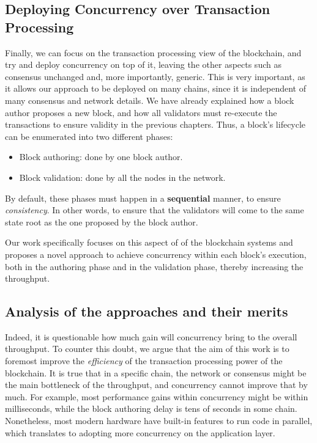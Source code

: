 \subsection{Deploying Concurrency over Transaction Processing}

Finally, we can focus on the transaction processing view of the blockchain, and try and deploy
concurrency on top of it, leaving the other aspects such as consensus unchanged and, more
importantly, generic. This is very important, as it allows our approach to be deployed on many
chains, since it is independent of many consensus and network details. We have already explained how
a block author proposes a new block, and how all validators must re-execute the transactions to
ensure validity in the previous chapters. Thus, a block's lifecycle can be enumerated into two
different phases:

\begin{itemize}
	\item Block authoring: done by one block author.
	\item Block validation: done by all the nodes in the network.
\end{itemize}

By default, these phases must happen in a \textbf{sequential} manner, to ensure \textit{consistency}. In
other words, to ensure that the validators will come to the same state root as the one proposed by
the block author.

Our work specifically focuses on this aspect of of the blockchain systems and proposes a novel
approach to achieve concurrency within each block's execution, both in the authoring phase and in
the validation phase, thereby increasing the throughput.

\subsection{Analysis of the approaches and their merits} \label{chap_bg:subsec:summary_speedup}

Indeed, it is questionable how much gain will concurrency bring to the overall
throughput. To counter this doubt, we argue that the aim of this work is to foremost improve the
\textit{efficiency} of the transaction processing power of the blockchain. It is true that in a
specific chain, the network or consensus might be the main bottleneck of the throughput, and
concurrency cannot improve that by much. For example, most performance gains within concurrency
might be within milliseconds, while the block authoring delay is tens of seconds in some chain.
Nonetheless, most modern hardware have built-in features to run code in parallel,
which translates to adopting more concurrency on the application layer.

